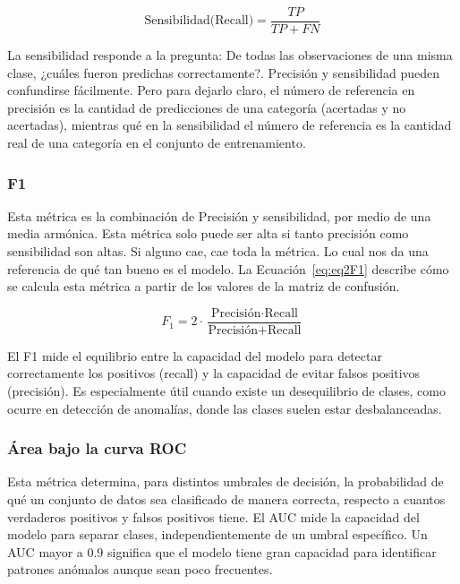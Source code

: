 \documentclass[11pt,a4paper,spanish]{book}
\numberwithin{equation}{chapter}
\numberwithin{figure}{chapter}
\begin{document}
\begin{equation}\label{eq:eq2recall}
\text{Sensibilidad(Recall)} = \frac{TP}{TP + FN}
\end{equation}

La sensibilidad responde a la pregunta: De todas las observaciones de una misma clase, 
¿cuáles fueron predichas correctamente?. Precisión y sensibilidad pueden confundirse 
fácilmente. Pero para dejarlo claro, el número de referencia en precisión es la 
cantidad de predicciones de una categoría (acertadas y no acertadas), mientras qué en 
la sensibilidad el número de referencia es la cantidad real de una categoría en el 
conjunto de entrenamiento.


\subsubsection{F1}

Esta métrica es la combinación de Precisión y sensibilidad, por medio de una media 
armónica. Esta métrica solo puede ser alta si tanto precisión como sensibilidad son 
altas. Si alguno cae, cae toda la métrica. Lo cual nos da una referencia de qué tan 
bueno es el modelo. La Ecuación~\eqref{eq:eq2F1} describe cómo se calcula esta métrica 
a partir de los valores de la matriz de confusión. 

\begin{equation}\label{eq:eq2F1}
F_1 = 2 \cdot \frac{\text{Precisión} \cdot \text{Recall}}{\text{Precisión} + \text{Recall}}
\end{equation}


El F1 mide el equilibrio entre la capacidad del modelo para detectar correctamente los 
positivos (recall) y la capacidad de evitar falsos positivos (precisión). 
Es especialmente útil cuando existe un desequilibrio de clases, como ocurre en detección 
de anomalías, donde las clases suelen estar desbalanceadas. 


\subsubsection{Área bajo la curva ROC}

Esta métrica determina, para distintos umbrales de decisión, la probabilidad de qué un 
conjunto de datos sea clasificado de manera correcta, respecto a cuantos verdaderos 
positivos y falsos positivos tiene. El AUC mide la capacidad del modelo para separar 
clases, independientemente de un umbral específico. Un AUC mayor a 0.9 significa que el 
modelo tiene gran capacidad para identificar patrones anómalos aunque sean poco frecuentes.
\end{document}
